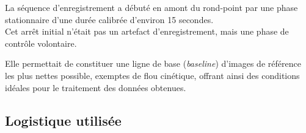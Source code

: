 \documentclass[12pt,a4paper,oneside]{report}
\begin{document}
\vspace{0.1cm}

\hspace*{1cm}La séquence d'enregistrement a débuté en amont du rond-point par une phase stationnaire d'une durée calibrée d'environ 15 secondes.\\
 Cet arrêt initial n'était pas un artefact d'enregistrement, mais une phase de contrôle volontaire.\vspace{0.1cm}

\hspace*{.5cm}Elle permettait de constituer une ligne de base (\textit{baseline}) d'images de référence les plus nettes possible, exemptes de flou cinétique, offrant ainsi des conditions idéales pour le traitement des données obtenues.

\subsection{Logistique utilisée}
\end{document}
